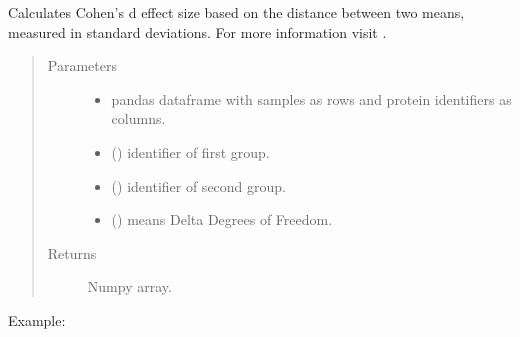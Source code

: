 \documentclass[letterpaper,10pt,english]{sphinxmanual}
\begin{document}

\begin{fulllineitems}
\label{\detokenize{_autosummary/analytics_core.analytics:analytics_core.analytics.analytics.cohen_d}}
Calculates Cohen’s d effect size based on the distance between two means, measured in standard deviations.
For more information visit .
\begin{quote}\begin{description}
\item[{Parameters}] \leavevmode\begin{itemize}
\item {} 
 \textendash{} pandas dataframe with samples as rows and protein identifiers as columns.

\item {} 
 () \textendash{} identifier of first group.

\item {} 
 () \textendash{} identifier of second group.

\item {} 
 () \textendash{} means Delta Degrees of Freedom.

\end{itemize}

\item[{Returns}] \leavevmode
Numpy array.

\end{description}\end{quote}

Example:

\begin{sphinxVerbatim}[commandchars=\\\{\}]
     
\end{sphinxVerbatim}

\end{fulllineitems}
\end{document}
